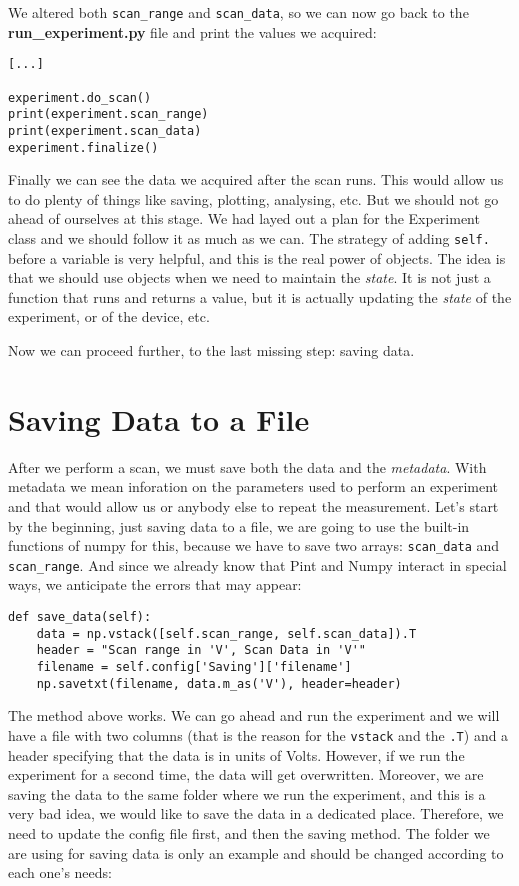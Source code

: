 We altered both \texttt{scan\_range} and \texttt{scan\_data}, so we can now go back to the \textbf{run\_experiment.py} file and print the values we acquired:

\begin{verbatim}
[...]

experiment.do_scan()
print(experiment.scan_range)
print(experiment.scan_data)
experiment.finalize()
\end{verbatim}

Finally we can see the data we acquired after the scan runs. This would allow us to do plenty of things like saving, plotting, analysing, etc. But we should not go ahead of ourselves at this stage. We had layed out a plan for the Experiment class and we should follow it as much as we can. The strategy of adding \texttt{self.} before a variable is very helpful, and this is the real power of objects. The idea is that we should use objects when we need to maintain the \emph{state}. It is not just a function that runs and returns a value, but it is actually updating the \emph{state} of the experiment, or of the device, etc.

Now we can proceed further, to the last missing step: saving data.

\section{Saving Data to a File}\label{section:saving-data}
After we perform a scan, we must save both the data and the \emph{metadata}. With metadata we mean inforation on the parameters used to perform an experiment and that would allow us or anybody else to repeat the measurement. Let's start by the beginning, just saving data to a file, we are going to use the built-in functions of numpy for this, because we have to save two arrays: \texttt{scan\_data} and \texttt{scan\_range}. And since we already know that Pint and Numpy interact in special ways, we anticipate the errors that may appear:

\begin{verbatim}
def save_data(self):
    data = np.vstack([self.scan_range, self.scan_data]).T
    header = "Scan range in 'V', Scan Data in 'V'"
    filename = self.config['Saving']['filename']
    np.savetxt(filename, data.m_as('V'), header=header)
\end{verbatim}

The method above works. We can go ahead and run the experiment and we will have a file with two columns (that is the reason for the \texttt{vstack} and the \texttt{.T}) and a header specifying that the data is in units of Volts. However, if we run the experiment for a second time, the data will get overwritten. Moreover, we are saving the data to the same folder where we run the experiment, and this is a very bad idea, we would like to save the data in a dedicated place. Therefore, we need to update the config file first, and then the saving method. The folder we are using for saving data is only an example and should be changed according to each one's needs:

